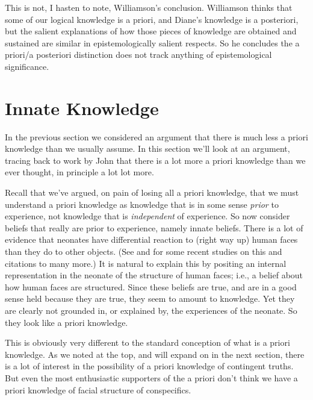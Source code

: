 This is not, I hasten to note, Williamson's conclusion. Williamson thinks that some of our logical knowledge is a priori, and Diane's knowledge is a posteriori, but the salient explanations of how those pieces of knowledge are obtained and sustained are similar in epistemologically salient respects. So he concludes the a priori\slash a posteriori distinction does not track anything of epistemological significance. 

\section{Innate Knowledge}
\label{innateknowledge}

In the previous section we considered an argument that there is much less a priori knowledge than we usually assume. In this section we'll look at an argument, tracing back to work by John  \citet{Hawthorne2007} that there is a lot more a priori knowledge than we ever thought, in principle a lot lot more.

Recall that we've argued, on pain of losing all a priori knowledge, that we must understand a priori knowledge as knowledge that is in some sense \emph{prior} to experience, not knowledge that is \emph{independent} of experience. So now consider beliefs that really are prior to experience, namely innate beliefs. There is a lot of evidence that neonates have differential reaction to (right way up) human faces than they do to other objects. (See  \citet{Chien2011} and  \citet{HeronDelaney2011} for some recent studies on this and citations to many more.) It is natural to explain this by positing an internal representation in the neonate of the structure of human faces; i.e., a belief about how human faces are structured. Since these beliefs are true, and are in a good sense held because they are true, they seem to amount to knowledge. Yet they are clearly not grounded in, or explained by, the experiences of the neonate. So they look like a priori knowledge.

This is obviously very different to the standard conception of what is a priori knowledge. As we noted at the top, and will expand on in the next section, there is a lot of interest in the possibility of a priori knowledge of contingent truths. But even the most enthusiastic supporters of the a priori don't think we have a priori knowledge of facial structure of conspecifics.

